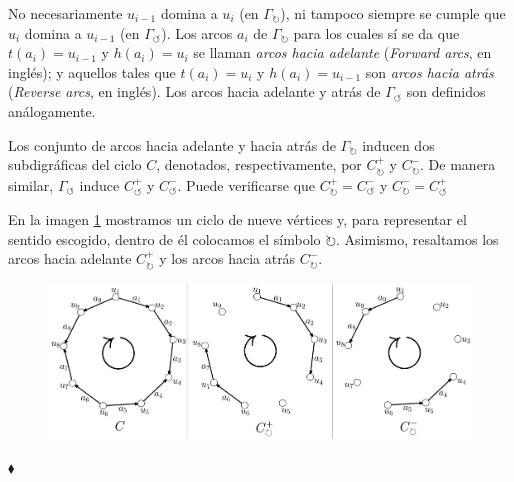   No necesariamente $u_{i-1}$ domina a $u_{i}$ (en $\Gamma_{\mathbf{\circlearrowright}}$), ni tampoco siempre se cumple que  $u_{i}$ domina a $u_{i-1}$ (en $\Gamma_{\mathbf{\circlearrowleft}}$). Los arcos $a_{i}$ de $\Gamma_{\mathbf{\circlearrowright}}$ para los cuales sí se da que $t(a_{i}) = u_{i-1}$ y $h(a_{i})=u_{i}$ se llaman \textit{arcos hacia adelante} (\textit{Forward arcs}, en inglés); y aquellos tales que $t(a_{i})=u_{i}$ y $h(a_{i})=u_{i-1}$ son \textit{arcos hacia atrás} (\textit{Reverse arcs}, en inglés). Los arcos hacia adelante y atrás de $\Gamma_{\mathbf{\circlearrowleft}}$ son definidos análogamente.

Los conjunto de arcos hacia adelante y hacia atrás de $\Gamma_{\mathbf{\circlearrowright}}$ inducen dos subdigráficas del ciclo $C$, denotados, respectivamente, por $C^{+}_{\mathbf{\circlearrowright}}$ y $C^{-}_{\mathbf{\circlearrowright}}$. De manera similar, $\Gamma_{\mathbf{\circlearrowleft}}$ induce $C^{+}_{\mathbf{\circlearrowleft}}$ y $C^{-}_{\mathbf{\circlearrowleft}}$. Puede verificarse que $C^{+}_{\mathbf{\circlearrowright}}=C^{-}_{\mathbf{\circlearrowleft}}$ y $C^{-}_{\mathbf{\circlearrowright}} = C^{+}_{\mathbf{\circlearrowleft}} $

\begin{ejem}
En la imagen \ref{fig:ciclosentidos} mostramos un ciclo de nueve vértices y, para representar el sentido escogido, dentro de él colocamos el símbolo $\mathbf{\circlearrowright}$. Asimismo, resaltamos los arcos hacia adelante $C^{+}_{\mathbf{\circlearrowright}}$ y los arcos hacia atrás $C^{-}_{\mathbf{\circlearrowright}}$. 

\begin{figure}[H]
    \centering
    \includegraphics[scale=0.15]{img/imgchapter1/sentidociclos.jpg}
    \caption{}
    \label{fig:ciclosentidos}
\end{figure}

\hfill $\blacklozenge$
\end{ejem}

